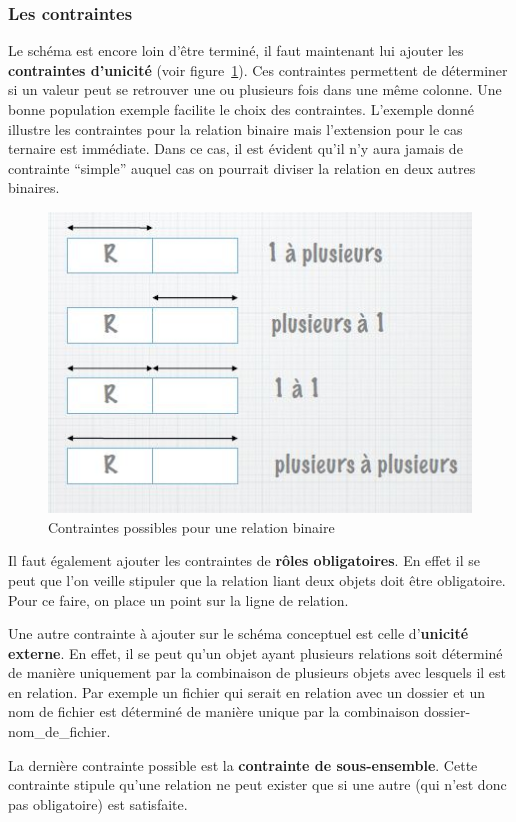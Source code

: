 \subsubsection{Les contraintes}
Le schéma est encore loin d'être terminé,
il faut maintenant lui ajouter les \textbf{contraintes d'unicité}
(voir figure~\ref{contraintes}).
Ces contraintes permettent de déterminer si un valeur peut se retrouver
une ou plusieurs fois dans une même colonne.
Une bonne population exemple facilite le choix des contraintes.
L'exemple donné illustre les contraintes pour la relation binaire mais
l'extension pour le cas ternaire est immédiate.
Dans ce cas,
il est évident qu'il n'y aura jamais de contrainte ``simple''
auquel cas on pourrait diviser la relation en deux autres binaires.
\begin{figure}[h]
  \centering
  \includegraphics[scale=0.8]{contraintes.jpg}
  \caption{Contraintes possibles pour une relation binaire}
  \label{contraintes}
\end{figure}

Il faut également ajouter les contraintes de \textbf{rôles obligatoires}.
En effet il se peut que l'on veille stipuler que la relation
liant deux objets doit être obligatoire.
Pour ce faire, on place un point sur la ligne de relation.

Une autre contrainte à ajouter sur le schéma conceptuel est celle
d'\textbf{unicité externe}.
En effet, il se peut qu'un objet ayant plusieurs relations soit déterminé
de manière uniquement par la combinaison de plusieurs objets avec lesquels
il est en relation.
Par exemple un fichier qui serait en relation avec un dossier et un nom de
fichier est déterminé
de manière unique par la combinaison dossier-nom\_de\_fichier.

La dernière contrainte possible est la \textbf{contrainte de sous-ensemble}.
Cette contrainte stipule qu'une relation ne peut exister que
si une autre (qui n'est donc pas obligatoire) est satisfaite.

